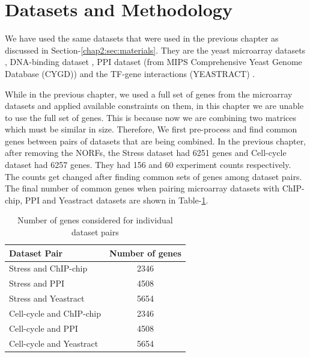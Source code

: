 \section{Datasets and Methodology} \label{chap3:sec:materials}

We have used the same datasets that were used in the previous chapter as discussed in Section-\ref{chap2:sec:materials}. They are the yeast microarray 
datasets \citep{gasch00genomicexpn,spellman98comprehensive}, DNA-binding dataset \citep{harbison04transcriptional}, 
PPI dataset (from MIPS Comprehensive Yeast Genome Database (CYGD)) \citep{Gueldener2006MPact} and the TF-gene interactions (YEASTRACT) \citep{Teixeira06yeastract}. 

While in the previous chapter, we used a full set of genes from the microarray datasets and applied available constraints on them, in this chapter we are unable to use 
the full set of genes. This is because now we are combining two matrices which must be similar in size. Therefore, We first pre-process and find common genes between 
pairs of datasets that are being combined. In the previous chapter, after removing the NORFs, the Stress dataset had 6251 genes and Cell-cycle dataset had 6257 genes. 
They had 156 and 60 experiment counts respectively. The counts get changed after finding common sets of genes among dataset pairs. The final number of common genes when pairing 
microarray datasets with ChIP-chip, PPI and Yeastract datasets are shown in Table-\ref{tab:datasetpair_commongenes}.  
 
\begin{table}
\centering
\begin{tabular}{|l|c|}
\hline
Dataset Pair & Number of genes \\ 
\hline
Stress and ChIP-chip & 2346 \\
Stress and PPI       & 4508 \\
Stress and Yeastract  & 5654 \\
\hline 
Cell-cycle and ChIP-chip & 2346\\
Cell-cycle and PPI       & 4508\\
Cell-cycle and Yeastract  & 5654\\
\hline
\end{tabular}
\caption{Number of genes considered for individual dataset pairs}
\label{tab:datasetpair_commongenes}
\end{table}

